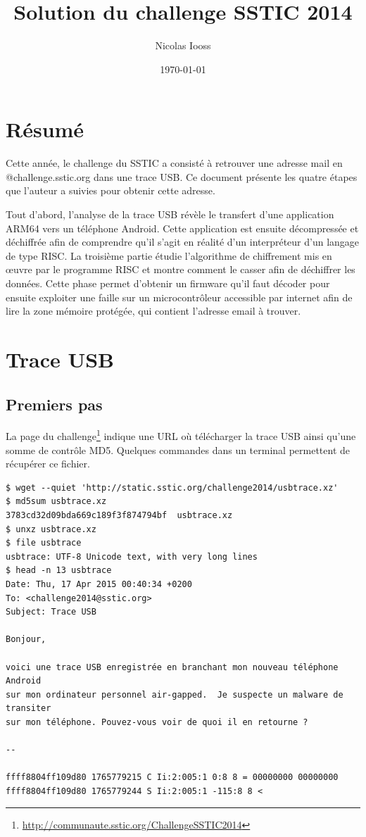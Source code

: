 \documentclass[a4paper,10pt]{article}
\title{Solution du challenge SSTIC 2014}
\author{Nicolas Iooss}
\date{\today}
\begin{document}
\maketitle

\section*{Résumé}

Cette année, le challenge du SSTIC a consisté à retrouver une adresse mail en @challenge.sstic.org dans une trace USB. Ce document présente les quatre étapes que l'auteur a suivies pour obtenir cette adresse.

Tout d'abord, l'analyse de la trace USB révèle le transfert d'une application ARM64 vers un téléphone Android. Cette application est ensuite décompressée et déchiffrée afin de comprendre qu'il s'agit en réalité d'un interpréteur d'un langage de type RISC. La troisième partie étudie l'algorithme de chiffrement mis en \oe{}uvre par le programme RISC et montre comment le casser afin de déchiffrer les données. Cette phase permet d'obtenir un firmware qu'il faut décoder pour ensuite exploiter une faille sur un microcontrôleur accessible par internet afin de lire la zone mémoire protégée, qui contient l'adresse email à trouver.


\tableofcontents

\clearpage
\section{Trace USB}

\subsection{Premiers pas}

La page du challenge\footnote{\url{http://communaute.sstic.org/ChallengeSSTIC2014}} indique une URL où télécharger la trace USB ainsi qu'une somme de contrôle MD5. Quelques commandes dans un terminal permettent de récupérer ce fichier.

\begin{verbatim}
$ wget --quiet 'http://static.sstic.org/challenge2014/usbtrace.xz'
$ md5sum usbtrace.xz
3783cd32d09bda669c189f3f874794bf  usbtrace.xz
$ unxz usbtrace.xz
$ file usbtrace
usbtrace: UTF-8 Unicode text, with very long lines
$ head -n 13 usbtrace
Date: Thu, 17 Apr 2015 00:40:34 +0200
To: <challenge2014@sstic.org>
Subject: Trace USB

Bonjour,

voici une trace USB enregistrée en branchant mon nouveau téléphone Android
sur mon ordinateur personnel air-gapped.  Je suspecte un malware de transiter
sur mon téléphone. Pouvez-vous voir de quoi il en retourne ?

--

ffff8804ff109d80 1765779215 C Ii:2:005:1 0:8 8 = 00000000 00000000
ffff8804ff109d80 1765779244 S Ii:2:005:1 -115:8 8 <
\end{verbatim}
\end{document}

